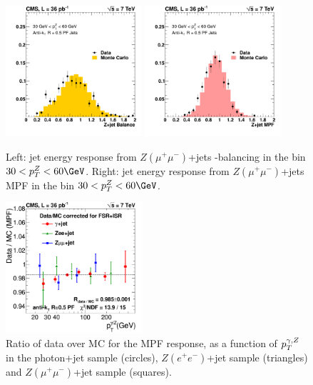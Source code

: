 \begin{figure}[ht!]
  \begin{center}
    \includegraphics[width=0.45\textwidth]{Figures/JEC/jetresp_Pt30to60}
    \includegraphics[width=0.45\textwidth]{Figures/JEC/mpfresp_Pt30to60}
    \caption{Left: jet energy response from $Z(\mu^+\mu^-)$+jets \pt-balancing in the bin $30<\pt^Z<60\GeV$. Right: jet energy response from $Z(\mu^+\mu^-)$+jets MPF in the bin $30<\pt^Z<60\GeV$.}
    \label{fig:ZJB}
  \end{center}
\end{figure}

\begin{figure}[ht!]
  \begin{center}
    \includegraphics[width=0.45\textwidth]{Figures/JEC/FinalDataOverMC4_plusZ_AK5}
    \caption{Ratio of data over MC for the MPF response, as a function of $p_{{T}}^{\gamma,Z}$ in the photon+jet sample (circles), $Z(e^+e^-)$+jet sample (triangles) and $Z(\mu^+\mu^-)$+jet sample (squares).}
    \label{fig:dataMCAll}
  \end{center}
\end{figure}

